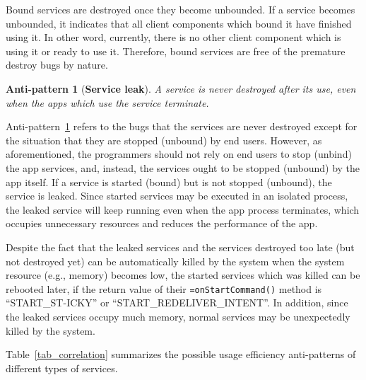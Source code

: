\documentclass[sigconf,review, anonymous]{acmart}
\newcommand{\hytt}[1]{\texttt{\hyphenchar\font=\defaulthyphenchar #1}}
\newtheorem{pattern}{Anti-pattern}
\begin{document}
Bound services are destroyed once they become unbounded.
If a service becomes unbounded, it indicates that all client components which bound it have finished using it.
In other word, currently, there is no other client component which is using it or ready to use it. Therefore, bound services are free of the premature destroy bugs by nature.

%

\begin{pattern} [\textbf{Service leak}] A service is never destroyed after its use, even when the apps which use the service terminate.
\label{p_serviceleak}
\end{pattern}




Anti-pattern~\ref{p_serviceleak} refers to the bugs that the services are never destroyed except for the situation that they are stopped (unbound) by end users. However, as aforementioned, the programmers should not rely on end users to stop (unbind) the app services, and, instead, the services ought to be stopped (unbound) by the app itself. If a service is started (bound) but is not stopped (unbound), the service is leaked. Since started services may be executed in an isolated process, the leaked service will keep running even when the app process terminates, which occupies unnecessary resources and reduces the performance of the app. %

Despite the fact that the leaked services and the services destroyed too late (but not destroyed yet) can be automatically killed by the system when the system resource (e.g., memory) becomes low, the started services which was killed can be rebooted later, if the return value of their \hytt{onStartCommand()} method is ``START\_ST-ICKY'' or ``START\_REDELIVER\_INTENT''. In addition, since the leaked services occupy much memory, normal services may be unexpectedly killed by the system.

Table~\ref{tab_correlation} summarizes the possible usage efficiency anti-patterns of different types of services.
\end{document}
